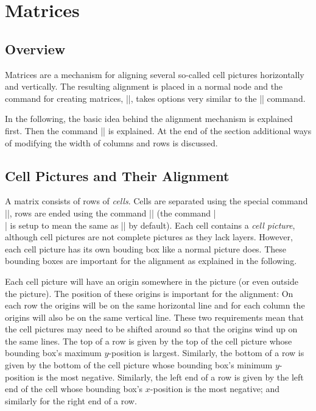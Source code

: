 %
%
%


\section{Matrices}

\label{section-base-matrices}

\subsection{Overview}

Matrices are a mechanism for aligning several so-called cell pictures 
horizontally and vertically. The resulting alignment is placed in a
normal node and the command for creating matrices, |\pgfmatrix|, takes
options very similar to the |\pgfnode| command.

In the following, the basic idea behind the alignment mechanism is
explained first. Then the command |\pgfmatrix| is explained. At the
end of the section additional ways of modifying the width of columns
and rows is discussed.


\subsection{Cell Pictures and Their Alignment}

A matrix consists of rows of \emph{cells}. Cells are separated using
the special command |\pgfmatrixnextcell|, rows are ended using the
command |\pgfmatrixendrow| (the command |\\| is setup to mean the same
as |\pgfmatrixendrow| by default). Each cell contains a \emph{cell
  picture}, although cell pictures are not complete pictures as they
lack layers. However, each cell picture has its own bouding box like a
normal picture does. These bounding boxes are important for the
alignment as explained in the following.

Each cell picture will have an origin somewhere in the picture (or
even outside the picture). The position of these origins is important
for the alignment: On each row the origins will be on the same
horizontal line and for each column the origins will also be on the
same vertical line. These two requirements mean that the cell pictures
may need to be shifted around so that the origins wind up on the same
lines. The top of a row is given by the top of the cell picture whose
bounding box's maximum $y$-position is largest. Similarly, the bottom
of a row is given by the bottom of the cell picture whose bounding
box's minimum $y$-position is the most negative. Similarly, the left
end of a row is given by the left end of the cell whose bounding box's
$x$-position is the most negative; and similarly for the right end of
a row.

